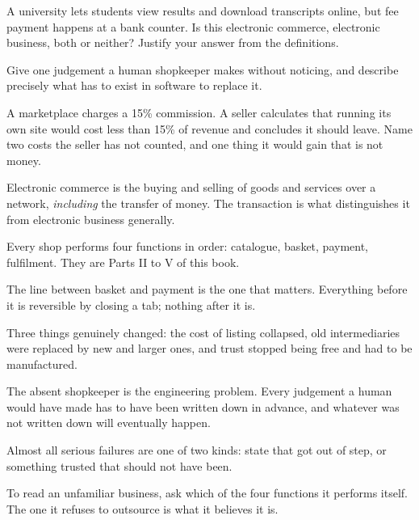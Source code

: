 \begin{checkpoint}
\begin{tightnum}
  \item A university lets students view results and download transcripts
        online, but fee payment happens at a bank counter. Is this electronic
        commerce, electronic business, both or neither? Justify your answer from
        the definitions.
  \item Give one judgement a human shopkeeper makes without noticing, and
        describe precisely what has to exist in software to replace it.
  \item A marketplace charges a 15\% commission. A seller calculates that
        running its own site would cost less than 15\% of revenue and concludes
        it should leave. Name two costs the seller has not counted, and one
        thing it would gain that is not money.
\end{tightnum}
\end{checkpoint}

\begin{chaptersummary}
\begin{tight}
  \item Electronic commerce is the buying and selling of goods and services over
        a network, \emph{including} the transfer of money. The transaction is
        what distinguishes it from electronic business generally.
  \item Every shop performs four functions in order: catalogue, basket, payment,
        fulfilment. They are Parts II to V of this book.
  \item The line between basket and payment is the one that matters. Everything
        before it is reversible by closing a tab; nothing after it is.
  \item Three things genuinely changed: the cost of listing collapsed, old
        intermediaries were replaced by new and larger ones, and trust stopped
        being free and had to be manufactured.
  \item The absent shopkeeper is the engineering problem. Every judgement a
        human would have made has to have been written down in advance, and
        whatever was not written down will eventually happen.
  \item Almost all serious failures are one of two kinds: state that got out of
        step, or something trusted that should not have been.
  \item To read an unfamiliar business, ask which of the four functions it
        performs itself. The one it refuses to outsource is what it believes it
        is.
\end{tight}
\end{chaptersummary}

